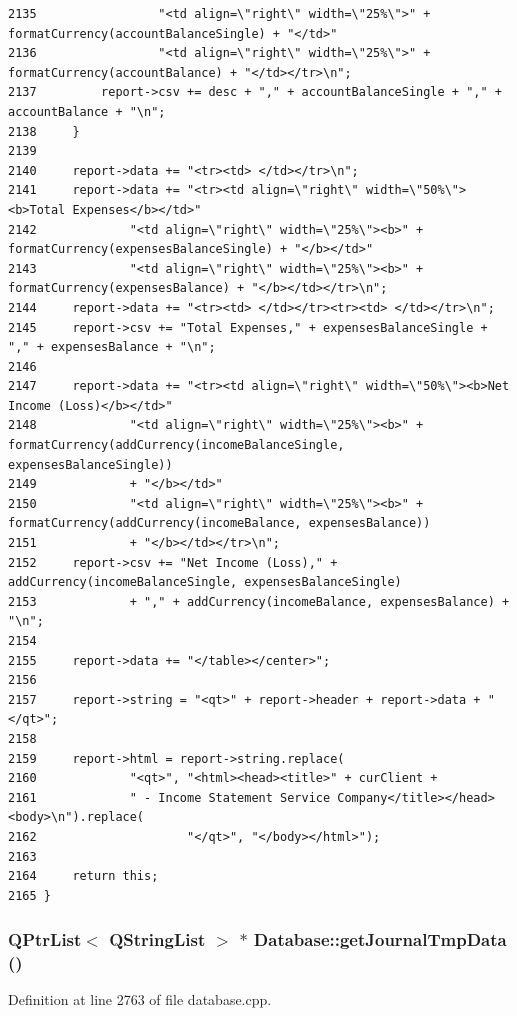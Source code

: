 \begin{verbatim}
2135                 "<td align=\"right\" width=\"25%\">" + formatCurrency(accountBalanceSingle) + "</td>"
2136                 "<td align=\"right\" width=\"25%\">" + formatCurrency(accountBalance) + "</td></tr>\n";
2137         report->csv += desc + "," + accountBalanceSingle + "," + accountBalance + "\n";
2138     }
2139 
2140     report->data += "<tr><td> </td></tr>\n";
2141     report->data += "<tr><td align=\"right\" width=\"50%\"><b>Total Expenses</b></td>"
2142             "<td align=\"right\" width=\"25%\"><b>" + formatCurrency(expensesBalanceSingle) + "</b></td>"
2143             "<td align=\"right\" width=\"25%\"><b>" + formatCurrency(expensesBalance) + "</b></td></tr>\n";
2144     report->data += "<tr><td> </td></tr><tr><td> </td></tr>\n";
2145     report->csv += "Total Expenses," + expensesBalanceSingle + "," + expensesBalance + "\n";
2146 
2147     report->data += "<tr><td align=\"right\" width=\"50%\"><b>Net Income (Loss)</b></td>"
2148             "<td align=\"right\" width=\"25%\"><b>" + formatCurrency(addCurrency(incomeBalanceSingle, expensesBalanceSingle))
2149             + "</b></td>"
2150             "<td align=\"right\" width=\"25%\"><b>" + formatCurrency(addCurrency(incomeBalance, expensesBalance))
2151             + "</b></td></tr>\n";
2152     report->csv += "Net Income (Loss)," + addCurrency(incomeBalanceSingle, expensesBalanceSingle)
2153             + "," + addCurrency(incomeBalance, expensesBalance) + "\n";
2154 
2155     report->data += "</table></center>";
2156 
2157     report->string = "<qt>" + report->header + report->data + "</qt>";
2158 
2159     report->html = report->string.replace(
2160             "<qt>", "<html><head><title>" + curClient +
2161             " - Income Statement Service Company</title></head><body>\n").replace(
2162                     "</qt>", "</body></html>");
2163 
2164     return this;
2165 }
\end{verbatim}\normalsize 


\hypertarget{classDatabase_a38}{
\subsubsection[getJournalTmpData]{\setlength{\rightskip}{0pt plus 5cm}QPtr\-List$<$ QString\-List $>$ $\ast$ Database::get\-Journal\-Tmp\-Data ()}}
\label{classDatabase_a38}


Definition at line 2763 of file database.cpp.

